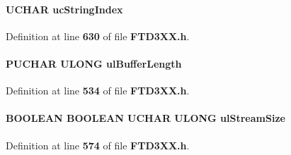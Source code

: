\paragraph[{uc\+String\+Index}]{\setlength{\rightskip}{0pt plus 5cm}U\+C\+H\+AR uc\+String\+Index}\label{FTD3XX_8h_aeee3f7a8152481476c4bd12a7d1e2e3e}


Definition at line {\bf 630} of file {\bf F\+T\+D3\+X\+X.\+h}.

\paragraph[{ul\+Buffer\+Length}]{ P\+U\+C\+H\+AR U\+L\+O\+NG ul\+Buffer\+Length}\label{FTD3XX_8h_a7dfc839aa3f1eab01d6866a11d889872}


Definition at line {\bf 534} of file {\bf F\+T\+D3\+X\+X.\+h}.

\paragraph[{ul\+Stream\+Size}]{\setlength{\rightskip}{0pt plus 5cm}B\+O\+O\+L\+E\+AN B\+O\+O\+L\+E\+AN U\+C\+H\+AR U\+L\+O\+NG ul\+Stream\+Size}\label{FTD3XX_8h_af846ee3a602d178fe725cb312d594698}


Definition at line {\bf 574} of file {\bf F\+T\+D3\+X\+X.\+h}.

